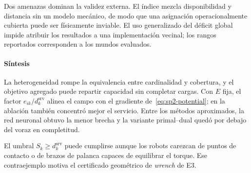 Dos amenazas dominan la validez externa. El índice mezcla disponibilidad y distancia sin un modelo mecánico, de modo que una asignación operacionalmente cubierta puede ser físicamente inviable. El uso generalizado del déficit global impide atribuir los resultados a una implementación vecinal; los rangos reportados corresponden a los mundos evaluados.

\paragraph{Síntesis}

La heterogeneidad rompe la equivalencia entre cardinalidad y cobertura, y el objetivo agregado puede repartir capacidad sin completar cargas. Con $E$ fija, el factor $e_{ik}/d_k^{\mathrm{srv}}$ alinea el campo con el gradiente de~\eqref{eq:sp2-potential}; en la ablación también concentró mejor el servicio. Entre los métodos aproximados, la red neuronal obtuvo la menor brecha y la variante primal--dual quedó por debajo del voraz en completitud.

El umbral $S_k\geq d_k^{\mathrm{srv}}$ puede cumplirse aunque los robots carezcan de puntos de contacto o de brazos de palanca capaces de equilibrar el torque. Ese contraejemplo motiva el certificado geométrico de \emph{wrench} de E3.
